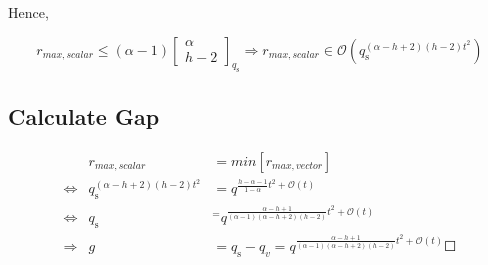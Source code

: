 Hence,

\[
r_{max,scalar}\leq\left(\alpha-1\right)\left[\begin{array}{c}
\alpha\\
h-2
\end{array}\right]_{q_{\mathrm{s}}}\Rightarrow r_{max,scalar}\in\mathcal{O}\left(q_{\mathrm{s}}^{\left(\alpha-h+2\right)\left(h-2\right)t^{2}}\right)
\]


\subsection{Calculate Gap }

\begin{eqnarray*}
 & r_{max,scalar} & =min\left[r_{max,vector}\right]\\
\Leftrightarrow & q_{\mathrm{s}}^{\left(\alpha-h+2\right)\left(h-2\right)t^{2}} & =q^{\frac{h-\alpha-1}{1-\alpha}t^{2}+\mathcal{O}(t)}\\
\Leftrightarrow & q_{\mathrm{s}} & ^{=}q^{\frac{\alpha-h+1}{\left(\alpha-1\right)\left(\alpha-h+2\right)\left(h-2\right)}t^{2}+\mathcal{O}(t)}\\
\Rightarrow & g & =q_{\mathrm{s}}-q_{v}=q^{\frac{\alpha-h+1}{\left(\alpha-1\right)\left(\alpha-h+2\right)\left(h-2\right)}t^{2}+\mathcal{O}(t)}\Square
\end{eqnarray*}


